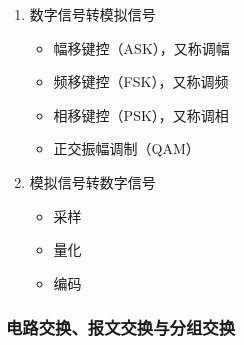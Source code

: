 \documentclass[12pt, a4paper, oneside]{ctexart}
\begin{document}
\begin{enumerate}
    \item 数字信号转模拟信号
    \begin{itemize}
        \item 幅移键控（ASK），又称调幅
        \item 频移键控（FSK），又称调频
        \item 相移键控（PSK），又称调相
        \item 正交振幅调制（QAM）
    \end{itemize}
    \item 模拟信号转数字信号
    \begin{itemize}
        \item 采样
        \item 量化
        \item 编码
    \end{itemize}
\end{enumerate}

\subsubsection{电路交换、报文交换与分组交换}
\end{document}
